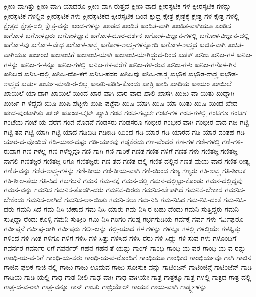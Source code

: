 {ಕ್ಷೀಣ-ವಾಗಿತ್ತು
ಕ್ಷೀಣ-ವಾಗಿ-ಯಾದರೂ
ಕ್ಷೀಣ-ವಾಗಿ-ರುತ್ತದೆ
ಕ್ಷೀಣ-ವಾದ
ಕ್ಷೀರಸ್ಫಟಿಕ-ಗಳ
ಕ್ಷೀರಸ್ಫಟಿಕ-ಗಳನ್ನು
ಕ್ಷೀರಸ್ಫಟಿಕ-ಗಳಲ್ಲಿನ
ಕ್ಷೀರಸ್ಫಟಿಕ-ಗಳು
ಕ್ಷೀರಸ್ಫಟಿಕದ
ಕ್ಷೀರಸ್ಫಟಿಕ-ದಿಂದ
ಕ್ಷುದ್ರ
ಕ್ಷೇತ್ರ
ಕ್ಷೇತ್ರಕ್ಕೆ
ಕ್ಷೇತ್ರ-ಗಳ
ಕ್ಷೇತ್ರ-ಗಳಲ್ಲಿ
ಕ್ಷೇತ್ರದ
ಕ್ಷೇತ್ರ-ದಲ್ಲಿ
ಕ್ಷೇತ್ರ-ವನ್ನು
ಖಂಡ-ಗಳನ್ನು
ಖಂಡದ
ಖಂಡಿತ
ಖಂಡಿತ-ವಾಗಿ
ಖಂಡಿತ-ವಾಗಿಯೂ
ಖಂಡಿಸ
ಖಗೋಳ
ಖಗೋಳಜ್ಞರು
ಖಗೋಳಜ್ಞಾನ
ಖಗೋಳ-ದೂರ-ದರ್ಶಕ
ಖಗೋಳ-ವಿಜ್ಞಾನ-ಗಳಲ್ಲಿ
ಖಗೋಳ-ವಿಜ್ಞಾನ-ದಲ್ಲಿ
ಖಗೋಳವು
ಖಗೋಳ-ವೇಧ
ಖಗೋಳ-ಶಾಸ್ತ್ರ
ಖಗೋಳ-ಶಾಸ್ತ್ರ-ಗಳನ್ನೋದಿ
ಖಗೋಳ-ಶಾಸ್ತ್ರದ
ಖಚಿತ-ವಾಗಿ
ಖಚಿತ-ವಾಗಿಯೂ
ಖಜಾಂಚಿ
ಖಜಾಂಚಿಗೆ
ಖಜಾಂಚಿ-ಯಾಗಿ
ಖಜಾಂಚಿ-ಯಾಗಿದ್ದುದ-ರಿಂದ
ಖಡಕ್
ಖನಿಜ
ಖನಿಜ-ಗಳ
ಖನಿಜ-ಗಳನ್ನು
ಖನಿಜ-ಗ-ಳನ್ನೂ
ಖನಿಜ-ಗಳಲ್ಲಿ
ಖನಿಜ-ಗಳ-ವರೆಗೆ
ಖನಿಜ-ಗಳಿ-ರುವ
ಖನಿಜ-ಗಳು
ಖನಿಜ-ಗಳೊಳ-ಗಿನ
ಖನಿಜದ
ಖನಿಜ-ದಲ್ಲಿ
ಖನಿಜ-ದೊ-ಳಗೆ
ಖನಿಜ-ಪದರ
ಖನಿಜವು
ಖನಿಜ-ಶಾಸ್ತ್ರ
ಖಭೌತ
ಖಭೌತ-ಶಾಸ್ತ್ರ
ಖಭೌತ-ಶಾಸ್ತ್ರದ
ಖರ್ಚು
ಖರ್ಚು-ಮಾಡಿ-ರ-ಲಿಲ್ಲ
ಖಾತರಿ-ಪಡಿಸಿ-ಕೊಂಡು
ಖಾತ್ರಿ
ಖಾದಿ
ಖಾದಿಯ
ಖಾಯಂ
ಖಾಯಿಲೆ
ಖಾಯಿಲೆ-ಯಾ-ದಾಗ
ಖಾಯಿಲೆ-ಯಿಂದ
ಖಾರ-ವಾಗಿ
ಖಾರ-ವಾದ
ಖಾಲಿ
ಖಾಸಗಿ
ಖುಜು-ವಾ-ಯಿತು
ಖುದ್ದಾಗಿ
ಖುರ್ಚಿ-ಗ-ಳಿದ್ದವು
ಖುಷಿ
ಖುಷಿ-ಪಟ್ಟಳು
ಖುಷಿ-ಪಟ್ಟೆವು
ಖುಷಿ-ಯಾಗಿ
ಖುಷಿ-ಯಾ-ಯಿತು
ಖುಷಿ-ಯಿಂದ
ಖೇದ
ಖೇದ-ವುಂಟಾಗಿತ್ತು
ಖೇರ್
ಖೊಂಡ-ಲೈಟ್
ಖ್ಯಾತಿ
ಗಂಟೆ
ಗಂಟೆ-ಗಟ್ಟಲೇ
ಗಂಟೆ-ಗಳ
ಗಂಟೆ-ಗಳಲ್ಲಿ
ಗಂಟೆಗೂ
ಗಂಟೆಗೆ
ಗಂಟೆಯ
ಗಂಟೆ-ಯ-ವರೆಗೆ
ಗಂಡ-ನೊಡನೆ
ಗಂಡಸರು
ಗಂಡಸರೂ
ಗಂಭೀರ
ಗಂಭೀರ-ವಾಗಿ
ಗಂಭೀರ-ವಾದ
ಗಜ
ಗಟ್ಟಿ
ಗಟ್ಟಿ-ತನ
ಗಟ್ಟಿ-ಯಾಗಿ
ಗಟ್ಟಿ-ಯಾದ
ಗಡಿಬಿಡಿ
ಗಡಿಬಿಡಿ-ಯಿಂದ
ಗಡಿ-ಯಾರ
ಗಡಿ-ಯಾರದ
ಗಡಿ-ಯಾರ-ದಂತಹ
ಗಡಿ-ಯಾರ-ದ-ವೊಂದಿದೆ
ಗಡಿ-ಯಾರ-ದಷ್ಟು
ಗಡಿ-ಯಾರವು
ಗಡ್ಡಕೆರೆದು
ಗಣ-ವೆಂದರೆ
ಗಣಿ-ಗಳ
ಗಣಿ-ಗಳಲ್ಲಿ
ಗಣಿ-ಗಳಿ-ರುವಾಗ
ಗಣಿ-ಗಳೆಲ್ಲ
ಗಣಿ-ಗಳೆಲ್ಲವೂ
ಗಣಿ-ಗಾಗಿ
ಗಣಿ-ಗಾರಿಕೆ
ಗಣಿತ
ಗಣಿತ-ಗಳಿಗೆ
ಗಣಿತ-ಗಳು
ಗಣಿತಜ್ಞ
ಗಣಿತಜ್ಞ-ನಾಗಲಿ
ಗಣಿತಜ್ಞರ
ಗಣಿತಜ್ಞ-ರಿಗೂ
ಗಣಿತಜ್ಞರು
ಗಣಿ-ತದ
ಗಣಿತ-ದಲ್ಲಿ
ಗಣಿತ-ದಲ್ಲಿನ
ಗಣಿತ-ಮಯ-ವಾದ
ಗಣಿತ-ರೀತ್ಯ
ಗಣಿತ-ವನ್ನು
ಗಣಿತ-ಶಾಸ್ತ್ರ-ಗಳನ್ನು
ಗಣಿ-ತೀಯ
ಗಣಿ-ತೀಯ-ವಾಗಿ
ಗಣಿ-ಯಿಂದ
ಗಣ್ಯ
ಗಣ್ಯರು
ಗತಿ-ಶಾಸ್ತ್ರ
ಗತಿ-ಶೀಲಕ
ಗತಿ-ಶೀಲ-ತೆಯ
ಗತಿ-ಸಿದ
ಗಬಗಬನೆ
ಗಮನ
ಗಮ-ನಕ್ಕೆ
ಗಮನ-ದಲ್ಲಿ
ಗಮನ-ದಲ್ಲಿಟ್ಟು-ಕೊಂಡು
ಗಮನ-ದಲ್ಲಿದ್ದವು
ಗಮನ-ವನ್ನು
ಗಮನಿಸ
ಗಮನಿಸ-ತೊಡಗಿ-ದರು
ಗಮನಿಸ-ದಿರರು
ಗಮನಿಸ-ಬೇಕಾಗಿದೆ
ಗಮನಿಸ-ಬೇಕಾದ
ಗಮನಿಸ-ಬೇಕೆಂದು
ಗಮನಿಸ-ಲಾಗಿದೆ
ಗಮನಿಸ-ಲಾ-ಯಿತು
ಗಮನಿ-ಸಲು
ಗಮ-ನಿಸಿ
ಗಮ-ನಿಸಿದ
ಗಮ-ನಿಸಿ-ದಂತೆ
ಗಮ-ನಿಸಿ-ದರು
ಗಮನಿ-ಸಿದೆ
ಗಮ-ನಿಸಿ-ಬೇಕಾದ
ಗಮ-ನಿಸಿ-ಯಾರು
ಗಮ-ನಿಸಿ-ರ-ಬಹು-ದೆಂದು
ಗಮನಿ-ಸುತ್ತಿದ್ದರು
ಗಮನಿ-ಸುತ್ತಿದ್ದಾ-ರೆಂದು-ಕೊಳ್ಳಿ
ಗಮನಿ-ಸುತ್ತೀರಿ
ಗಮಿ-ನಿಸಿ
ಗರಿಗರಿ
ಗರಿಷ್ಠ
ಗರ್ಭಗುಡಿಯ
ಗರ್ವಕ್ಕೆ
ಗರ್ವ-ಗಳು
ಗರ್ವಿಷ್ಟರೂ
ಗರ್ವಿಷ್ಠನೆ
ಗರ್ವಿಷ್ಠ-ರಾಗಿ
ಗರ್ವಿಷ್ಠರು
ಗಲೀ-ಜನ್ನು
ಗಲ್ಲಿ-ಯಾದ
ಗಳ
ಗಳನ್ನು
ಗಳನ್ನೂ
ಗಳಲ್ಲಿ
ಗಳಲ್ಲಿಯೇ
ಗಳಷ್ಟಿತ್ತು
ಗಳಿಂದ
ಗಳಿ-ಗಿಂತ
ಗಳಿಗೂ
ಗಳಿಗೆ
ಗಳಿಸಿ
ಗಳಿ-ಸಿತ್ತು
ಗಳಿಸಿದ
ಗಳಿಸಿ-ದರು
ಗಳಿ-ಸಿದ್ದು
ಗಳಿ-ಸುವ
ಗಳು
ಗಳೊಂದಿಗೆ
ಗವರ್ನರ
ಗವರ್ನರ-ರಿಗೆ
ಗವರ್ನರ್
ಗಹನ
ಗಹನ-ತೆ-ಯನ್ನು
ಗಾಂಗ್
ಗಾಂಧಿ
ಗಾಂಧಿ-ಯ-ವರ
ಗಾಂಧಿ-ಯ-ವ-ರನ್ನು
ಗಾಂಧಿ-ಯ-ವ-ರಿಗೆ
ಗಾಂಧಿ-ಯ-ವರು
ಗಾಂಧಿ-ಯ-ವ-ರೊಂದಿಗೆ
ಗಾಂಧಿಯೂ
ಗಾಂಧೀಜಿ
ಗಾಂಭಿರ್ಯವೂ
ಗಾಗಿ
ಗಾಜಿನ
ಗಾಜಿನ-ಫಲಕ
ಗಾಜಿ-ನಲ್ಲಿ
ಗಾಜು
ಗಾಜು-ಊದುವ
ಗಾಜು-ಸೋಸುಕ-ವನ್ನು
ಗಾಟಿಂಜನ್
ಗಾಟಿಂಜಿನ್ಗೆ
ಗಾಟಿಂಜೆನ್
ಗಾಡಿ
ಗಾಡಿಯ
ಗಾಡಿ-ಯಲ್ಲಿ
ಗಾಢ
ಗಾಢ-ನೀಲಿ
ಗಾಢ-ವಾಗಿ
ಗಾಢ-ವಾಗಿಯೇ
ಗಾತ್ರ
ಗಾತ್ರಕ್ಕೂ
ಗಾತ್ರ-ಗಳಲ್ಲಿ
ಗಾತ್ರದ
ಗಾತ್ರ-ದಲ್ಲಿ
ಗಾತ್ರ-ದ-ವ-ರಾಗಿ
ಗಾತ್ರ-ವನ್ನೂ
ಗಾನ್
ಗಾಬರಿ
ಗಾಬ್ರಿಯೇಲ್
ಗಾಯನ
ಗಾಯ-ವಾಗಿ
ಗಾರ್ಡ್ನ್ಗಳನ್ನು
}
